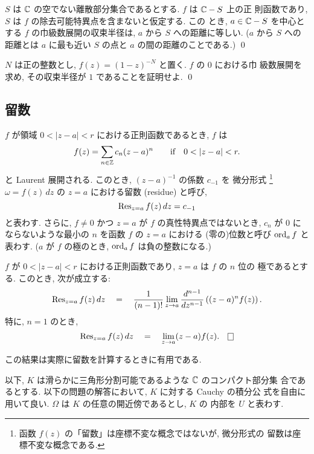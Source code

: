 \documentclass[12pt,twoside]{jarticle}
\begin{document}
\begin{question}
  $S$ は ${\mathbb C}$ の空でない離散部分集合であるとする. $f$ は ${\mathbb C}-S$ 上の正
  則函数であり, $S$ は $f$ の除去可能特異点を含まないと仮定する. この
  とき, $a\in{\mathbb C}-S$ を中心とする $f$ の巾級数展開の収束半径は, $a$ から 
  $S$ への距離に等しい. ($a$ から $S$ への距離とは $a$ に最も近い $S$ 
  の点と $a$ の間の距離のことである.) \qed
\end{question}

\begin{question}
  $N$ は正の整数とし, $f(z)=(1-z)^{-N}$ と置く. $f$ の $0$ における巾
  級数展開を求め, その収束半径が $1$ であることを証明せよ. \qed
\end{question}


\subsection{留数}

$f$ が領域 $0<|z-a|<r$ における正則函数であるとき, $f$ は
\[%
  f(z) = \sum_{n\in\Z} c_n (z - a)^n
  \qquad\text{if}\quad
  0 < |z -a| < r.
\]%
と Laurent 展開される. このとき, $(z - a)^{-1}$ の係数 $c_{-1}$ を %
微分形式%
\footnote{函数 $f(z)$ の「留数」は座標不変な概念ではないが, 微分形式の
  留数は座標不変な概念である.} %
$\omega = f(z)\,dz$ の $z = a$ における留数 (residue) と呼び,
\[%
  \Res_{z=a}f(z)\,dz = c_{-1}
\]%
と表わす. さらに, $f\ne0$ かつ $z=a$ が $f$ の真性特異点ではないとき,
$c_n$ が $0$ にならないような最小の $n$ を函数 $f$ の $z=a$ における
(零の)位数と呼び $\mathop{\mathrm{ord}}\nolimits_a f$ と表わす. %
($a$ が $f$ の極のとき, $\mathop{\mathrm{ord}}\nolimits_a f$ は負の整数になる.)

\begin{question}[留数の計算の仕方]
  $f$ が $0<|z-a|<r$ における正則函数であり, $z=a$ は $f$ の $n$ 位の
  極であるとする. このとき, 次が成立する:
  \[
    \mathop{\mathrm{Res}}\nolimits_{z=a}f(z)\,dz
    \quad = \quad
    \frac{1}{(n-1)!}
    \lim_{z\to a}
    \frac{d^{n-1}}{dz^{n-1}}\left( (z-a)^n f(z) \right).
  \]
  特に, $n=1$ のとき,
  \[
    \Res_{z=a}f(z)\,dz
    \quad = \quad
    \lim_{z\to a} (z-a)f(z).
    \qed
  \]
\end{question}

\noindent この結果は実際に留数を計算するときに有用である.

以下, $K$ は滑らかに三角形分割可能であるような ${\mathbb C}$ のコンパクト部分集
合であるとする. 以下の問題の解答において, $K$ に対する Cauchy の積分公
式を自由に用いて良い. $\Omega$ は $K$ の任意の開近傍であるとし, $K$ の
内部を $U$ と表わす.
\end{document}
